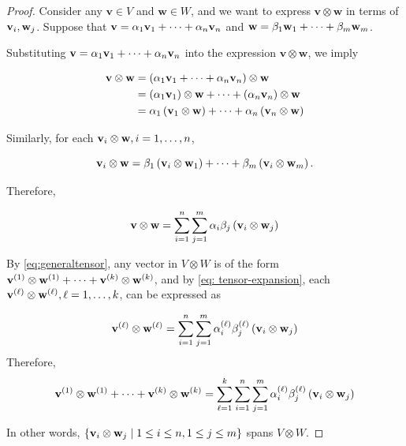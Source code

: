 \begin{proof} Consider any \(\mathbf{v} \in  V\) and \(\mathbf{w} \in  W\), and we want to express \(\mathbf{v} \otimes  \mathbf{w}\) in terms of \({\bf v}_{i},{\bf w}_{j}\). Suppose that \(\mathbf{v} = \alpha_1{\bf v}_1 + \cdots  + \alpha_n{\bf v}_n\) and \(\mathbf{w} = \beta_1{\bf w}_1 + \cdots  + \beta_{m}{\bf w}_{m}\).

Substituting \(\mathbf{v} = \alpha_1{\bf v}_1 + \cdots  + \alpha_n{\bf v}_n\) into the expression \(\mathbf{v} \otimes  \mathbf{w}\), we imply

\begin{align*}
\mathbf{v} \otimes  \mathbf{w} &= \left( {\alpha_1{\bf v}_1 + \cdots  + \alpha_n{\bf v}_n}\right)  \otimes  \mathbf{w} \\
&= \left( {\alpha_1{\bf v}_1}\right)  \otimes  \mathbf{w} + \cdots  + \left( {\alpha_n{\bf v}_n}\right)  \otimes  \mathbf{w} \\
&= \alpha_1\left( {{\bf v}_1 \otimes  \mathbf{w}}\right)  + \cdots  + \alpha_n\left( {{\bf v}_n \otimes  \mathbf{w}}\right)
\end{align*}

Similarly, for each \({\bf v}_{i} \otimes  \mathbf{w},i = 1,\ldots ,n\),

\[
{\bf v}_{i} \otimes  \mathbf{w} = \beta_1\left( {{\bf v}_{i} \otimes  {\bf w}_1}\right)  + \cdots  + \beta_{m}\left( {{\bf v}_{i} \otimes  {\bf w}_{m}}\right) .
\]

Therefore,

\begin{equation}\label{eq: tensor-expansion}
    \mathbf{v} \otimes  \mathbf{w} = \mathop{\sum }\limits_{{i = 1}}^n\mathop{\sum }\limits_{{j = 1}}^{m}\alpha_{i}\beta_{j}\left( {{\bf v}_{i} \otimes  {\bf w}_{j}}\right)
\end{equation}



By \autoref{eq:generaltensor}, any vector in \(V \otimes  W\) is of the form
\(
{\bf v}^{\left( 1\right) } \otimes  {\bf w}^{\left( 1\right) } + \cdots  + {\bf v}^{\left( k \right) } \otimes  {\bf w}^{\left( k \right) }
\), and by \autoref{eq: tensor-expansion}, each \({\bf v}^{\left( \ell \right) } \otimes  {\bf w}^{\left( \ell \right) },\ell = 1,\ldots ,k\), can be expressed as

\[
{\bf v}^{\left( \ell\right) } \otimes  {\bf w}^{\left( \ell\right) } = \mathop{\sum }\limits_{{i = 1}}^n\mathop{\sum }\limits_{{j = 1}}^{m}\alpha_{i}^{\left( \ell\right) }\beta_{j}^{\left( \ell\right) }\left( {{\bf v}_{i} \otimes  {\bf w}_{j}}\right)
\]
Therefore,
\[
{\bf v}^{\left( 1\right) } \otimes  {\bf w}^{\left( 1\right) } + \cdots  + {\bf v}^{\left( k \right) } \otimes  {\bf w}^{\left( k \right) } = \mathop{\sum }\limits_{{\ell = 1}}^{k}\mathop{\sum }\limits_{{i = 1}}^n\mathop{\sum }\limits_{{j = 1}}^{m}\alpha_{i}^{\left( \ell\right) }\beta_{j}^{\left( \ell\right) }\left( {{\bf v}_{i} \otimes  {\bf w}_{j}}\right)
\]

In other words, \(\left\{  {{\bf v}_{i} \otimes  {\bf w}_{j} \mid  1 \leq  i \leq  n,1 \leq  j \leq  m}\right\}\) spans \(V \otimes  W\).
\end{proof}


